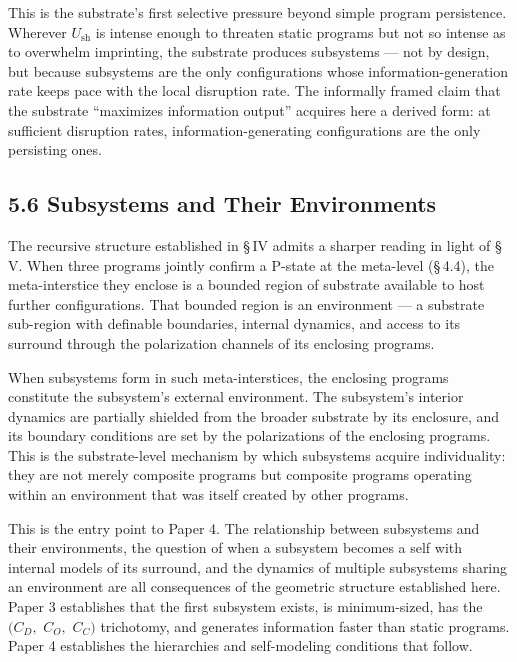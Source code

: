 \documentclass[11pt,oneside]{report}
\theoremstyle{definition}
\theoremstyle{remark}
\begin{document}
This is the substrate's first selective pressure beyond simple program
persistence. Wherever \ensuremath{U_{\mathrm{sh}}} is intense enough to threaten static programs
but not so intense as to overwhelm imprinting, the substrate produces
subsystems --- not by design, but because subsystems are the only
configurations whose information-generation rate keeps pace with the
local disruption rate. The informally framed claim that the substrate
``maximizes information output'' acquires here a derived form: at
sufficient disruption rates, information-generating configurations are
the only persisting ones.

\subsection*{5.6 Subsystems and Their Environments}

The recursive structure established in \S\,IV admits a sharper reading in
light of \S\,V. When three programs jointly confirm a P-state at the
meta-level (\S\,4.4), the meta-interstice they enclose is a bounded region
of substrate available to host further configurations. That bounded
region is an environment --- a substrate sub-region with definable
boundaries, internal dynamics, and access to its surround through the
polarization channels of its enclosing programs.

When subsystems form in such meta-interstices, the enclosing programs
constitute the subsystem's external environment. The subsystem's
interior dynamics are partially shielded from the broader substrate by
its enclosure, and its boundary conditions are set by the polarizations
of the enclosing programs. This is the substrate-level mechanism by
which subsystems acquire individuality: they are not merely composite
programs but composite programs operating within an environment that was
itself created by other programs.

This is the entry point to Paper 4. The relationship between subsystems
and their environments, the question of when a subsystem becomes a self
with internal models of its surround, and the dynamics of multiple
subsystems sharing an environment are all consequences of the geometric
structure established here. Paper 3 establishes that the first subsystem
exists, is minimum-sized, has the \ensuremath{(C_{D},} \ensuremath{C_{O},} \ensuremath{C_{C})} trichotomy, and
generates information faster than static programs. Paper 4 establishes
the hierarchies and self-modeling conditions that follow.
\end{document}
